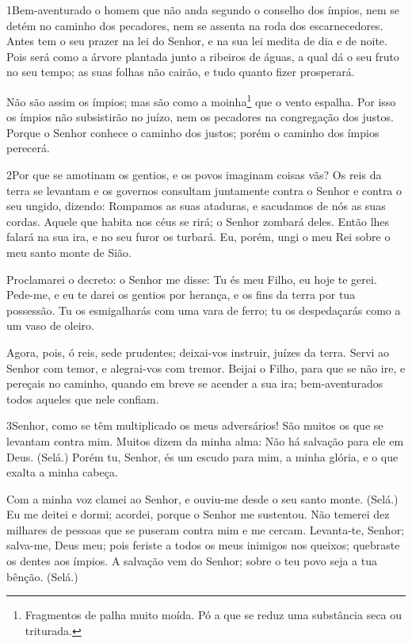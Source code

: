 
\lettrine{1}{}Bem-aventurado o homem que não anda segundo o
conselho dos ímpios, nem se detém no caminho dos pecadores, nem se
assenta na roda dos escarnecedores. Antes tem o seu prazer na
lei do Senhor, e na sua lei medita de dia e de noite. Pois será
como a árvore plantada junto a ribeiros de águas, a qual dá o seu
fruto no seu tempo; as suas folhas não cairão, e tudo quanto fizer
prosperará.

Não são assim os ímpios; mas são como a moinha\footnote{Fragmentos
de palha muito moída. Pó a que se reduz uma substância seca ou
triturada.} que o vento espalha. Por isso os ímpios não
subsistirão no juízo, nem os pecadores na congregação dos justos.
Porque o Senhor conhece o caminho dos justos; porém o caminho
dos ímpios perecerá.

\bigskip

\lettrine{2}{}Por que se amotinam os gentios, e os povos
imaginam coisas vãs? Os reis da terra se levantam e os governos
consultam juntamente contra o Senhor e contra o seu ungido, dizendo:
Rompamos as suas ataduras, e sacudamos de nós as suas cordas.
Aquele que habita nos céus se rirá; o Senhor zombará deles.
Então lhes falará na sua ira, e no seu furor os turbará. Eu,
porém, ungi o meu Rei sobre o meu santo monte de Sião.

Proclamarei o decreto: o Senhor me disse: Tu és meu Filho, eu hoje
te gerei. Pede-me, e eu te darei os gentios por herança, e os
fins da terra por tua possessão. Tu os esmigalharás com uma vara
de ferro; tu os despedaçarás como a um vaso de oleiro.

Agora, pois, ó reis, sede prudentes; deixai-vos instruir, juízes
da terra. Servi ao Senhor com temor, e alegrai-vos com
tremor. Beijai o Filho, para que se não ire, e pereçais no
caminho, quando em breve se acender a sua ira; bem-aventurados todos
aqueles que nele confiam.

\bigskip

\lettrine{3} Senhor, como se têm multiplicado os meus
adversários! São muitos os que se levantam contra mim. Muitos
dizem da minha alma: Não há salvação para ele em Deus. (Selá.)
Porém tu, Senhor, és um escudo para mim, a minha glória, e o que
exalta a minha cabeça.

Com a minha voz clamei ao Senhor, e ouviu-me desde o seu santo
monte. (Selá.) Eu me deitei e dormi; acordei, porque o Senhor me
sustentou. Não temerei dez milhares de pessoas que se puseram
contra mim e me cercam. Levanta-te, Senhor; salva-me, Deus meu;
pois feriste a todos os meus inimigos nos queixos; quebraste os
dentes aos ímpios. A salvação vem do Senhor; sobre o teu povo
seja a tua bênção. (Selá.)

